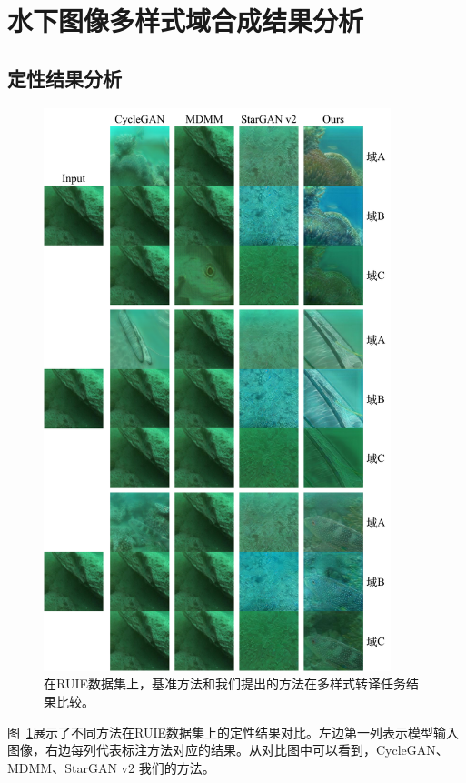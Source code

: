 \section{水下图像多样式域合成结果分析}
\subsection{定性结果分析}
\begin{figure}[htp]
    \centering
  \includegraphics[width=0.9\textwidth]{figures/comparison_ruie_domain.pdf}
  \caption{在RUIE数据集上，基准方法和我们提出的方法在多样式转译任务结果比较。}
  \label{fig:comparison_ruie_domain}
\end{figure}

图~\ref{fig:comparison_ruie_domain}展示了不同方法在RUIE数据集上的定性结果对比。左边第一列表示模型输入图像，右边每列代表标注方法对应的结果。从对比图中可以看到，CycleGAN、MDMM、StarGAN v2 我们的方法。


